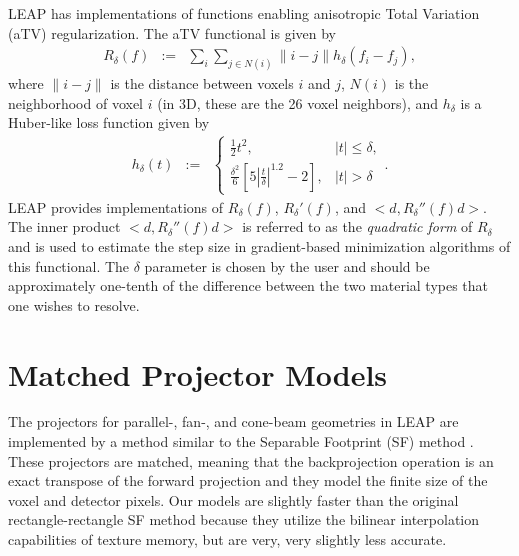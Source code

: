 \documentclass[11pt]{article}
\begin{document}
LEAP has implementations of functions enabling anisotropic Total Variation (aTV) regularization.  The aTV functional is given by
\begin{eqnarray*}
R_\delta(f) &:=& \sum_i \sum_{j \in N(i)} \|i-j\| h_\delta(f_i-f_j),
\end{eqnarray*}
where $\|i-j\|$ is the distance between voxels $i$ and $j$, $N(i)$ is the neighborhood of voxel $i$ (in 3D, these are the 26 voxel neighbors), and $h_\delta$ is a Huber-like loss function given by
\begin{eqnarray*}
h_\delta(t) &:=& \begin{cases} \frac{1}{2}t^2, & |t| \leq \delta, \\ \frac{\delta^2}{6}\left[5\left|\frac{t}{\delta}\right|^{1.2}-2\right], & |t| > \delta \end{cases}.
\end{eqnarray*}
LEAP provides implementations of $R_\delta(f)$, $R_{\delta}'(f)$, and $<d, R_{\delta}''(f)d>$.  The inner product $<d, R_{\delta}''(f)d>$ is referred to as the \textit{quadratic form} of $R_\delta$ and is used to estimate the step size in gradient-based minimization algorithms of this functional.  The $\delta$ parameter is chosen by the user and should be approximately one-tenth of the difference between the two material types that one wishes to resolve.

\section{Matched Projector Models}

The projectors for parallel-, fan-, and cone-beam geometries in LEAP are implemented by a method similar to the Separable Footprint (SF) method \cite{Long_TMI_2010}.  These projectors are matched, meaning that the backprojection operation is an exact transpose of the forward projection and they model the finite size of the voxel and detector pixels.  Our models are slightly faster than the original rectangle-rectangle SF method because they utilize the bilinear interpolation capabilities of texture memory, but are very, very slightly less accurate.


\end{document}
